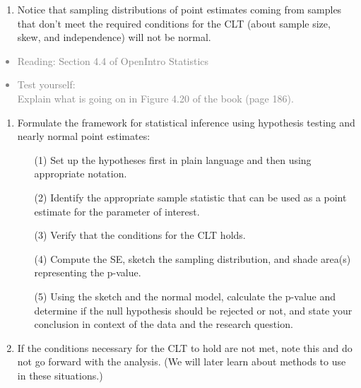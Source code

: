 \documentclass[11pt]{article}
\newcommand{\gray}[1]{\textcolor{gray}{#1}}
\begin{document}
%

\vspace{0.5cm}

%

\begin{enumerate}[resume]
\renewcommand\labelenumi{\textcolor{light}{\textbf{LO \theenumi.}}}

\item Notice that sampling distributions of point estimates coming from samples that don't meet the required conditions for the CLT (about sample size, skew, and independence) will not be normal.

\end{enumerate}

\gray{
{\it
\vspace{-0.5cm}
\begin{itemize}
\renewcommand{\labelitemi}{{\textcolor{dark}{$\ast$}}}
\item Reading: Section 4.4 of OpenIntro Statistics
\item Test yourself: \\
{\small
 Explain what is going on in Figure 4.20 of the book (page 186).
}
\end{itemize}
}}

%

\vspace{0.5cm}

%

\begin{enumerate}[resume]
\renewcommand\labelenumi{\textcolor{light}{\textbf{LO \theenumi.}}}

\item Formulate the framework for statistical inference using hypothesis testing and nearly normal point estimates:
\begin{enumerate}
\item[(1)] Set up the hypotheses first in plain language and then using appropriate notation.
\item[(2)] Identify the appropriate sample statistic that can be used as a point estimate for the parameter of interest.
\item[(3)] Verify that the conditions for the CLT holds.
\item[(4)] Compute the SE, sketch the sampling distribution, and shade area(s) representing the p-value.
\item[(5)] Using the sketch and the normal model, calculate the p-value and determine if the null hypothesis should be rejected or not, and state your conclusion in context of the data and the research question.
\end{enumerate}

\item If the conditions necessary for the CLT to hold are not met, note this and do not go forward with the analysis. (We will later learn about methods to use in these situations.)

\end{enumerate}
\end{document}
